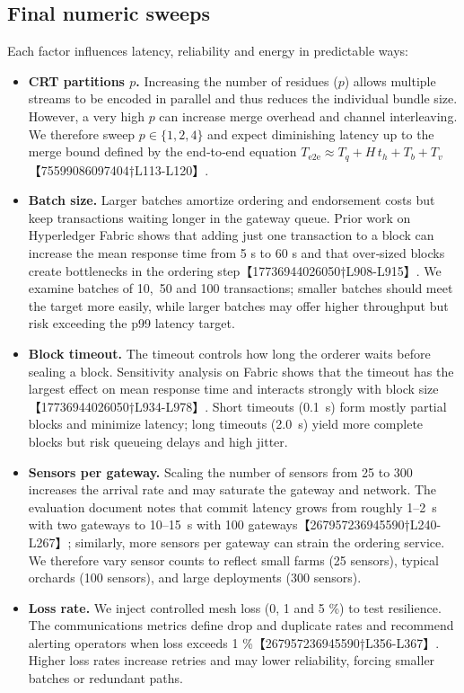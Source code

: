 \subsection{Final numeric sweeps}
\label{sec:numeric-sweeps}
Each factor influences latency, reliability and energy in predictable ways:
\begin{itemize}
  \item \textbf{CRT partitions $p$.} Increasing the number of residues ($p$) allows multiple streams to be encoded in parallel and thus reduces the individual bundle size.  However, a very high $p$ can increase merge overhead and channel interleaving.  We therefore sweep $p\in\{1,2,4\}$ and expect diminishing latency up to the merge bound defined by the end‑to‑end equation $T_{\mathrm{e2e}}\approx T_q + H\,t_h + T_b + T_v$【75599086097404†L113-L120】.

  \item \textbf{Batch size.} Larger batches amortize ordering and endorsement costs but keep transactions waiting longer in the gateway queue.  Prior work on Hyperledger Fabric shows that adding just one transaction to a block can increase the mean response time from 5 s to 60 s and that over‑sized blocks create bottlenecks in the ordering step【17736944026050†L908-L915】.  We examine batches of 10,~50 and 100 transactions; smaller batches should meet the \SLOpL{} target more easily, while larger batches may offer higher throughput but risk exceeding the p99 latency target.

  \item \textbf{Block timeout.} The timeout controls how long the orderer waits before sealing a block.  Sensitivity analysis on Fabric shows that the timeout has the largest effect on mean response time and interacts strongly with block size【17736944026050†L934-L978】.  Short timeouts (0.1~s) form mostly partial blocks and minimize latency; long timeouts (2.0~s) yield more complete blocks but risk queueing delays and high jitter.

  \item \textbf{Sensors per gateway.} Scaling the number of sensors from 25 to 300 increases the arrival rate and may saturate the gateway and network.  The evaluation document notes that commit latency grows from roughly 1–2~s with two gateways to 10–15~s with 100 gateways【267957236945590†L240-L267】; similarly, more sensors per gateway can strain the ordering service.  We therefore vary sensor counts to reflect small farms (25 sensors), typical orchards (100 sensors), and large deployments (300 sensors).

  \item \textbf{Loss rate.} We inject controlled mesh loss (0, 1 and 5 \%) to test resilience.  The communications metrics define drop and duplicate rates and recommend alerting operators when loss exceeds 1 \%【267957236945590†L356-L367】.  Higher loss rates increase retries and may lower reliability, forcing smaller batches or redundant paths.
\end{itemize}

